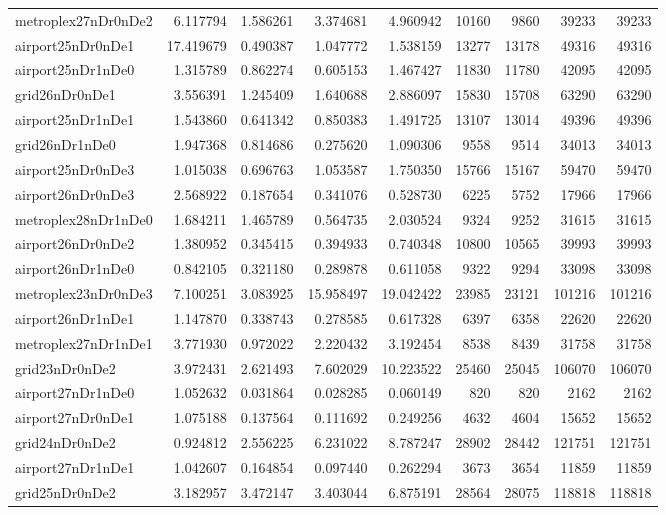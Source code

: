 \begin{longtable}{|l|r|r|r|r|r|r|r|r|}
metroplex27nDr0nDe2 & 6.117794 & 1.586261 & 3.374681 & 4.960942 & 10160 & 9860 & 39233 & 39233 \\
airport25nDr0nDe1 & 17.419679 & 0.490387 & 1.047772 & 1.538159 & 13277 & 13178 & 49316 & 49316 \\
airport25nDr1nDe0 & 1.315789 & 0.862274 & 0.605153 & 1.467427 & 11830 & 11780 & 42095 & 42095 \\
grid26nDr0nDe1 & 3.556391 & 1.245409 & 1.640688 & 2.886097 & 15830 & 15708 & 63290 & 63290 \\
airport25nDr1nDe1 & 1.543860 & 0.641342 & 0.850383 & 1.491725 & 13107 & 13014 & 49396 & 49396 \\
grid26nDr1nDe0 & 1.947368 & 0.814686 & 0.275620 & 1.090306 & 9558 & 9514 & 34013 & 34013 \\
airport25nDr0nDe3 & 1.015038 & 0.696763 & 1.053587 & 1.750350 & 15766 & 15167 & 59470 & 59470 \\
airport26nDr0nDe3 & 2.568922 & 0.187654 & 0.341076 & 0.528730 & 6225 & 5752 & 17966 & 17966 \\
metroplex28nDr1nDe0 & 1.684211 & 1.465789 & 0.564735 & 2.030524 & 9324 & 9252 & 31615 & 31615 \\
airport26nDr0nDe2 & 1.380952 & 0.345415 & 0.394933 & 0.740348 & 10800 & 10565 & 39993 & 39993 \\
airport26nDr1nDe0 & 0.842105 & 0.321180 & 0.289878 & 0.611058 & 9322 & 9294 & 33098 & 33098 \\
metroplex23nDr0nDe3 & 7.100251 & 3.083925 & 15.958497 & 19.042422 & 23985 & 23121 & 101216 & 101216 \\
airport26nDr1nDe1 & 1.147870 & 0.338743 & 0.278585 & 0.617328 & 6397 & 6358 & 22620 & 22620 \\
metroplex27nDr1nDe1 & 3.771930 & 0.972022 & 2.220432 & 3.192454 & 8538 & 8439 & 31758 & 31758 \\
grid23nDr0nDe2 & 3.972431 & 2.621493 & 7.602029 & 10.223522 & 25460 & 25045 & 106070 & 106070 \\
airport27nDr1nDe0 & 1.052632 & 0.031864 & 0.028285 & 0.060149 & 820 & 820 & 2162 & 2162 \\
airport27nDr0nDe1 & 1.075188 & 0.137564 & 0.111692 & 0.249256 & 4632 & 4604 & 15652 & 15652 \\
grid24nDr0nDe2 & 0.924812 & 2.556225 & 6.231022 & 8.787247 & 28902 & 28442 & 121751 & 121751 \\
airport27nDr1nDe1 & 1.042607 & 0.164854 & 0.097440 & 0.262294 & 3673 & 3654 & 11859 & 11859 \\
grid25nDr0nDe2 & 3.182957 & 3.472147 & 3.403044 & 6.875191 & 28564 & 28075 & 118818 & 118818 \\

\end{longtable}
